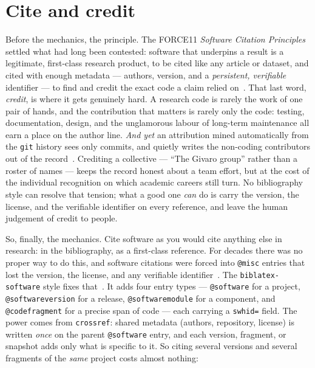 \section{Cite and credit}

Before the mechanics, the principle. The FORCE11 \emph{Software Citation Principles} settled what had
long been contested: software that underpins a result is a legitimate, first-class research product,
to be cited like any article or dataset, and cited with enough metadata --- authors, version, and a
\emph{persistent, verifiable} identifier --- to find and credit the exact code a claim relied
on~\autocite{force11citationprinciples}. That last word, \emph{credit}, is where it gets genuinely
hard. A research code is rarely the work of one pair of hands, and the contribution that matters is
rarely only the code: testing, documentation, design, and the unglamorous labour of long-term
maintenance all earn a place on the author line. \emph{And yet} an attribution mined automatically
from the \texttt{git} history sees only commits, and quietly writes the non-coding contributors out of
the record~\autocite{2020GtCitation}. Crediting a collective --- \enquote{The Givaro group} rather
than a roster of names --- keeps the record honest about a team effort, but at the cost of the
individual recognition on which academic careers still turn. No bibliography style can resolve that
tension; what a good one \emph{can} do is carry the version, the license, and the verifiable
identifier on every reference, and leave the human judgement of credit to people.

So, finally, the mechanics. Cite software as you would cite anything else in research: in the
bibliography, as a first-class reference. For decades there was no proper way to do this, and software citations were
forced into \texttt{@misc} entries that lost the version, the license, and any verifiable
identifier~\autocite{2020GtCitation}. The \texttt{biblatex-software} style fixes
that~\autocite{DiCosmoSEN2020,biblatexsoftware}. It adds four entry types --- \texttt{@software} for a project,
\texttt{@softwareversion} for a release, \texttt{@softwaremodule} for a component, and
\texttt{@codefragment} for a precise span of code --- each carrying a \texttt{swhid=} field. The
power comes from \texttt{crossref}: shared metadata (authors, repository, license) is written
\emph{once} on the parent \texttt{@software} entry, and each version, fragment, or snapshot adds only
what is specific to it. So citing several versions and several fragments of the \emph{same} project
costs almost nothing:

